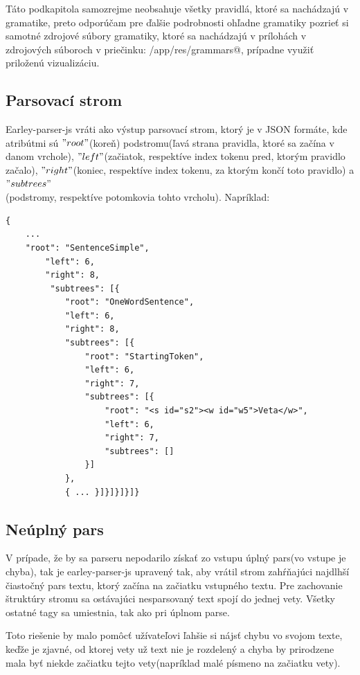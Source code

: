 \documentclass[12pt,a4paper]{report}
\theoremstyle{definition}
\theoremstyle{remark}
\begin{document}
\newpage
Táto podkapitola samozrejme neobsahuje všetky pravidlá, ktoré sa nachádzajú v gramatike, preto odporúčam pre ďalšie podrobnosti ohľadne gramatiky pozrieť si samotné zdrojové súbory gramatiky, ktoré sa nachádzajú v prílohách v zdrojových súboroch v priečinku: \verb@parser/app/res/grammars@, prípadne využiť priloženú vizualizáciu.


\subsection{Parsovací strom}
Earley-parser-js vráti ako výstup parsovací strom, ktorý je v JSON formáte, kde atribútmi sú $"root"$(koreň) podstromu(ľavá strana pravidla, ktoré sa začína v danom vrchole), $"left"$(začiatok, respektíve index tokenu pred, ktorým pravidlo začalo), $"right"$(koniec, respektíve index tokenu, za ktorým končí toto pravidlo) a $"subtrees"$ \\ (podstromy, respektíve potomkovia tohto vrcholu). Napríklad: 
\begin{lstlisting}[style=htmlcssjs, basicstyle=\fontsize{9}{11}\ttfamily]
 {
 	...
	"root": "SentenceSimple",
		"left": 6,
		"right": 8,
		 "subtrees": [{
			"root": "OneWordSentence",
			"left": 6,
			"right": 8,
			"subtrees": [{
				"root": "StartingToken",
				"left": 6,
				"right": 7,
				"subtrees": [{
					"root": "<s id="s2"><w id="w5">Veta</w>",
					"left": 6,
					"right": 7,
					"subtrees": []
				}]
			},
			{ ... }]}]}]}]}
\end{lstlisting}




\subsection{Neúplný pars}
V prípade, že by sa parseru nepodarilo získať zo vstupu úplný pars(vo vstupe je chyba), tak je earley-parser-js upravený tak, aby vrátil strom zahŕňajúci najdlhší čiastočný pars textu, ktorý začína na začiatku vstupného textu. Pre zachovanie štruktúry stromu sa ostávajúci nesparsovaný text spojí do jednej vety. Všetky ostatné tagy sa umiestnia, tak ako pri úplnom parse.

Toto riešenie by malo pomôcť užívateľovi ľahšie si nájsť chybu vo svojom texte, keďže je zjavné, od ktorej vety už text nie je rozdelený a chyba by prirodzene mala byť niekde začiatku tejto vety(napríklad malé písmeno na začiatku vety).
\end{document}
